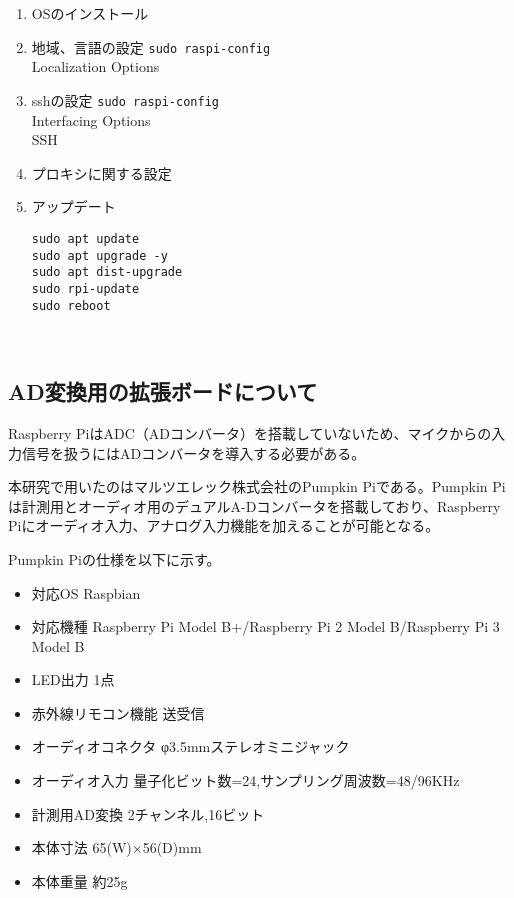 \begin{enumerate}
\renewcommand{\labelenumi}{(\arabic{enumi})}
\item
  OSのインストール
\item
  地域、言語の設定 \texttt{sudo\ raspi-config}\\
  Localization Options
\item
  sshの設定 \texttt{sudo\ raspi-config}\\
  Interfacing Options\\
  SSH
\item
  プロキシに関する設定
\item
  アップデート

\begin{lstlisting}[caption=@TODO,label=@TODO]
sudo apt update 
sudo apt upgrade -y 
sudo apt dist-upgrade
sudo rpi-update
sudo reboot
\end{lstlisting}
\end{enumerate}

\
\subsection{AD変換用の拡張ボードについて}\label{about-adc}

Raspberry
PiはADC（ADコンバータ）を搭載していないため、マイクからの入力信号を扱うにはADコンバータを導入する必要がある。

本研究で用いたのはマルツエレック株式会社の\cite{http://select.marutsu.co.jp/list/detail.php?id=258}{Pumpkin
Pi}である。Pumpkin
Piは計測用とオーディオ用のデュアルA-Dコンバータを搭載しており、Raspberry
Piにオーディオ入力、アナログ入力機能を加えることが可能となる。

Pumpkin Piの仕様を以下に示す。

\begin{itemize}
\tightlist
\item
  対応OS Raspbian
\item
  対応機種 Raspberry Pi Model B+/Raspberry Pi 2 Model B/Raspberry Pi 3
  Model B
\item
  LED出力 1点
\item
  赤外線リモコン機能 送受信
\item
  オーディオコネクタ φ3.5mmステレオミニジャック
\item
  オーディオ入力 量子化ビット数=24,サンプリング周波数=48/96KHz
\item
  計測用AD変換 2チャンネル,16ビット
\item
  本体寸法 65(W)×56(D)mm
\item
  本体重量 約25g
\end{itemize}

